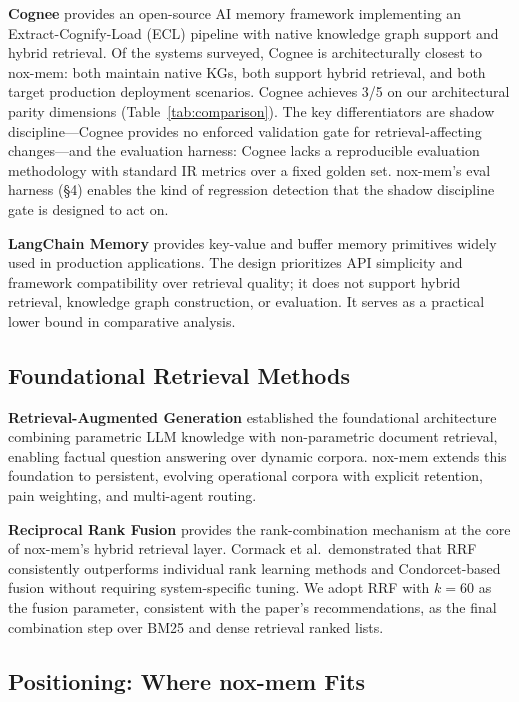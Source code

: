 \textbf{Cognee} \cite{topoteretes2024cognee} provides an open-source AI memory framework
implementing an Extract-Cognify-Load (ECL) pipeline with native knowledge graph support
and hybrid retrieval. Of the systems surveyed, Cognee is architecturally closest to
nox-mem: both maintain native KGs, both support hybrid retrieval, and both target
production deployment scenarios. Cognee achieves 3/5 on our architectural parity dimensions
(Table~\ref{tab:comparison}). The key differentiators are shadow discipline---Cognee provides
no enforced validation gate for retrieval-affecting changes---and the evaluation harness:
Cognee lacks a reproducible evaluation methodology with standard IR metrics over a fixed
golden set. nox-mem's eval harness (\S4) enables the kind of regression detection that the
shadow discipline gate is designed to act on.

\textbf{LangChain Memory} provides key-value and buffer memory primitives widely used in
production applications. The design prioritizes API simplicity and framework compatibility
over retrieval quality; it does not support hybrid retrieval, knowledge graph construction,
or evaluation. It serves as a practical lower bound in comparative analysis.

\subsection{Foundational Retrieval Methods}

\textbf{Retrieval-Augmented Generation} \cite{lewis2020rag} established the foundational
architecture combining parametric LLM knowledge with non-parametric document retrieval,
enabling factual question answering over dynamic corpora. nox-mem extends this foundation
to persistent, evolving operational corpora with explicit retention, pain weighting, and
multi-agent routing.

\textbf{Reciprocal Rank Fusion} \cite{cormack2009rrf} provides the rank-combination
mechanism at the core of nox-mem's hybrid retrieval layer. Cormack et al.\ demonstrated
that RRF consistently outperforms individual rank learning methods and Condorcet-based
fusion without requiring system-specific tuning. We adopt RRF with $k=60$ as the fusion
parameter, consistent with the paper's recommendations, as the final combination step over
BM25 and dense retrieval ranked lists.

\subsection{Positioning: Where nox-mem Fits}
\label{sec:positioning}

